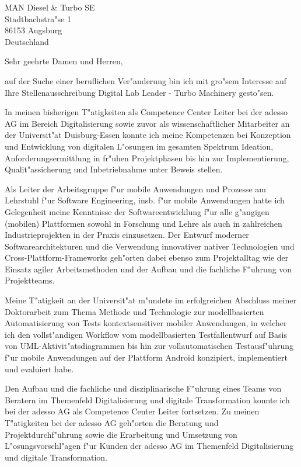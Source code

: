 \documentclass[11pt,a4paper]{dinbrief}
\date{\today}
\begin{document}
 
\begin{letter}  
{%
	MAN Diesel \& Turbo SE\\
	Stadtbachstra"se 1\\
	86153 Augsburg\\
	Deutschland
}
\subject{\bf Bewerbung Digital Lab Leader - Turbo Machinery}
\opening{Sehr geehrte Damen und Herren,}
auf der Suche einer beruflichen Ver"anderung bin ich mit gro"sem Interesse auf Ihre Stellenausschreibung Digital Lab Leader - Turbo Machinery gesto"sen. 

In meinen bisherigen T"atigkeiten als Competence Center Leiter bei der adesso AG im Bereich Digitalisierung sowie zuvor als wissenschaftlicher Mitarbeiter an der Universit"at Duisburg-Essen konnte ich meine Kompetenzen bei Konzeption und Entwicklung von digitalen L"osungen im gesamten Spektrum Ideation, Anforderungsermittlung in fr"uhen Projektphasen bis hin zur Implementierung, Qualit"assicherung und Inbetriebnahme unter Beweis stellen.

Als Leiter der Arbeitsgruppe f"ur mobile Anwendungen und Prozesse am Lehrstuhl f"ur Software Engineering, insb. f"ur mobile Anwendungen hatte ich Gelegenheit meine Kenntnisse der Softwareentwicklung f"ur alle g"angigen (mobilen) Plattformen sowohl in Forschung und Lehre als auch in zahlreichen Industrieprojekten in der Praxis einzusetzen. Der Entwurf moderner Softwarearchitekturen und die Verwendung innovativer nativer Technologien und Cross-Plattform-Frameworks geh"orten dabei ebenso zum Projektalltag wie der Einsatz agiler Arbeitsmethoden und der Aufbau und die fachliche  F"uhrung von Projektteams.

Meine T"atigkeit an der Universit"at m"undete im erfolgreichen Abschluss meiner Doktor\-arbeit zum Thema Methode und Technologie zur modellbasierten Automatisierung von Tests kontextsensitiver mobiler Anwendungen, in welcher ich den vollst"andigen Workflow vom modellbasierten Testfallentwurf auf Basis von UML-Aktivit"atsdiagrammen bis hin zur vollautomatischen Testausf"uhrung f"ur mobile Anwendungen auf der Plattform Android konzipiert, implementiert und evaluiert habe.

\clearpage
Den Aufbau und die fachliche und disziplinarische F"uhrung eines Teams von Beratern im Themenfeld Digitalisierung und digitale Transformation  konnte ich bei der adesso AG als Competence Center Leiter fortsetzen. Zu meinen T"atigkeiten bei der adesso AG geh"orten die Beratung und Projektdurchf"uhrung sowie die Erarbeitung und Umsetzung von L"osungsvorschl"agen f"ur Kunden der adesso AG im Themenfeld Digitalisierung und digitale Transformation. 


\end{letter}
\end{document}
